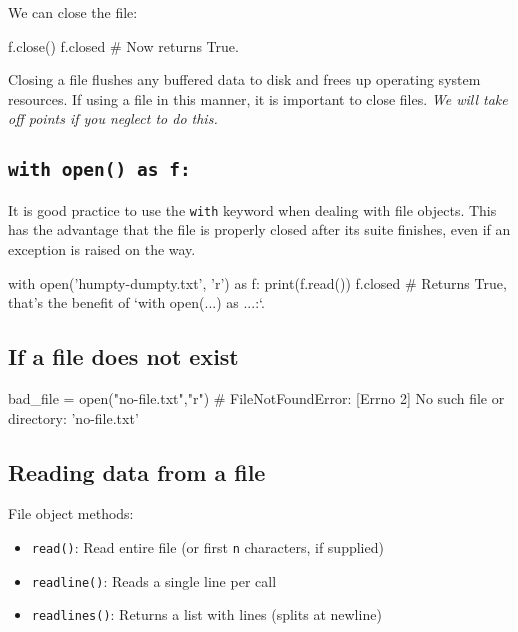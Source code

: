 \documentclass[12pt]{article} \newif\ifsolution\solutiontrue %
\begin{document}
We can close the file:

\begin{python}
f.close()
f.closed   # Now returns True.
\end{python}

Closing a file flushes any buffered data to disk and frees up operating
system resources. If using a file in this manner, it is important to
close files. \emph{We will take off points if you neglect to do this.}

\subsection{\texorpdfstring{\texttt{with\ open()\ as\ f:}}{with open() as f:}}\label{with-open-as-f}

It is good practice to use the \texttt{with} keyword when dealing with
file objects. This has the advantage that the file is properly closed
after its suite finishes, even if an exception is raised on the way.

\begin{python}
with open('humpty-dumpty.txt', 'r') as f:
    print(f.read())
f.closed  # Returns True, that's the benefit of `with open(...) as ...:`.
\end{python}

\subsection{If a file does not exist}\label{if-a-file-does-not-exist}

\begin{python}
bad_file = open("no-file.txt","r")
# FileNotFoundError: [Errno 2] No such file or directory: 'no-file.txt'
\end{python}

\subsection{Reading data from a file}\label{reading-data-from-a-file}

File object methods:

\begin{itemize}
\item
  \texttt{read()}: Read entire file (or first \texttt{n} characters, if
  supplied)
\item
  \texttt{readline()}: Reads a single line per call
\item
  \texttt{readlines()}: Returns a list with lines (splits at newline)
\end{itemize}
\end{document}
